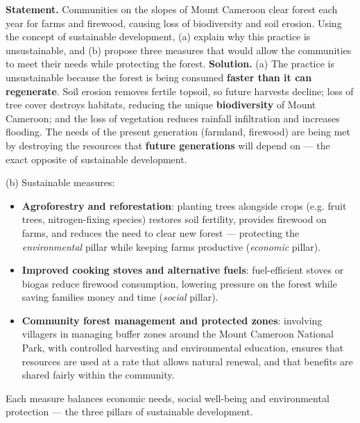 \documentclass[11pt]{article}
\begin{document}
\begin{exoresolu}
\textbf{Statement.} Communities on the slopes of Mount Cameroon clear forest each year for farms and firewood, causing loss of biodiversity and soil erosion. Using the concept of sustainable development, (a) explain why this practice is unsustainable, and (b) propose three measures that would allow the communities to meet their needs while protecting the forest.
\tcblower
\textbf{Solution.}
(a) The practice is unsustainable because the forest is being consumed \textbf{faster than it can regenerate}. Soil erosion removes fertile topsoil, so future harvests decline; loss of tree cover destroys habitats, reducing the unique \textbf{biodiversity} of Mount Cameroon; and the loss of vegetation reduces rainfall infiltration and increases flooding. The needs of the present generation (farmland, firewood) are being met by destroying the resources that \textbf{future generations} will depend on --- the exact opposite of sustainable development.

(b) Sustainable measures:
\begin{itemize}
\item \textbf{Agroforestry and reforestation}: planting trees alongside crops (e.g. fruit trees, nitrogen-fixing species) restores soil fertility, provides firewood on farms, and reduces the need to clear new forest --- protecting the \emph{environmental} pillar while keeping farms productive (\emph{economic} pillar).
\item \textbf{Improved cooking stoves and alternative fuels}: fuel-efficient stoves or biogas reduce firewood consumption, lowering pressure on the forest while saving families money and time (\emph{social} pillar).
\item \textbf{Community forest management and protected zones}: involving villagers in managing buffer zones around the Mount Cameroon National Park, with controlled harvesting and environmental education, ensures that resources are used at a rate that allows natural renewal, and that benefits are shared fairly within the community.
\end{itemize}
Each measure balances economic needs, social well-being and environmental protection --- the three pillars of sustainable development.
\end{exoresolu}
\end{document}
